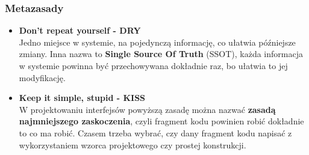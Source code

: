 \documentclass[../main.tex]{subfiles}
\begin{document}
    \subsubsection{Metazasady}
    \begin{itemize}
        \item \textbf{Don't repeat yourself - DRY}\\
        Jedno miejsce w systemie, na pojedynczą informację, co ułatwia późniejsze zmiany.
        Inna nazwa to \textbf{Single Source Of Truth} (SSOT), każda informacja w systemie powinna być przechowywana
        dokładnie raz, bo ułatwia to jej modyfikację.
        \item \textbf{Keep it simple, stupid - KISS}\\
        W projektowaniu interfejsów powyższą zasadę można nazwać \textbf{zasadą najmniejszego zaskoczenia}, czyli
        fragment kodu powinien robić dokładnie to co ma robić. Czasem trzeba wybrać, czy dany fragment kodu
        napisać z wykorzystaniem wzorca projektowego czy prostej konstrukcji.
    \end{itemize}
\end{document}
